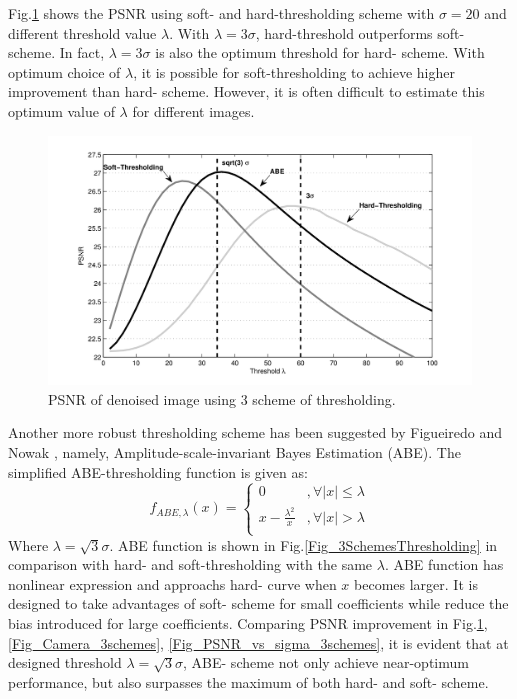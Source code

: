 \documentclass[11pt]{article}
\begin{document}
Fig.\ref{Fig_PSNR_vs_Threshold_3schemes} shows the PSNR using soft- and hard-thresholding scheme with $\sigma=20$ and different threshold value $\lambda$. With $\lambda = 3\sigma$, hard-threshold outperforms soft- scheme. In fact, $\lambda=3\sigma$ is also the optimum threshold for hard- scheme. With optimum choice of $\lambda$, it is possible for soft-thresholding to achieve higher improvement than hard- scheme. However, it is often difficult to estimate this optimum value of $\lambda$ for different images.

\begin{figure}[H]
	\centering
	\includegraphics[trim=0.5in 0.1in 0.5in 0in, width=5in]{Fig_PSNR_vs_Threshold_3schemes.png}
	\caption{PSNR of denoised image using 3 scheme of thresholding.}
	\label{Fig_PSNR_vs_Threshold_3schemes}
\end{figure}

Another more robust thresholding scheme has been suggested by Figueiredo and Nowak \cite{Figueiredo_2001}, namely, Amplitude-scale-invariant Bayes Estimation (ABE). The simplified ABE-thresholding function is given as:
$$
f_{ABE, \lambda}(x) = \left\{{\begin{array}{cc}
    0 &, \forall |x| \le \lambda \\
	x - \frac{\lambda^2}{x} &, \forall |x| > \lambda\\
\end{array}} \right.
$$
Where $\lambda = \sqrt{3}\sigma$. ABE function is shown in Fig.\ref{Fig_3SchemesThresholding} in comparison with hard- and soft-thresholding with the same $\lambda$. ABE function has nonlinear expression and approachs hard- curve when $x$ becomes larger. It is designed to take advantages of soft- scheme for small coefficients while reduce the bias introduced for large coefficients. Comparing PSNR improvement in Fig.\ref{Fig_PSNR_vs_Threshold_3schemes}, \ref{Fig_Camera_3schemes}, \ref{Fig_PSNR_vs_sigma_3schemes}, it is evident that at designed threshold $\lambda = \sqrt{3}\sigma$, ABE- scheme not only achieve near-optimum performance, but also surpasses the maximum of both hard- and soft- scheme.
\end{document}

